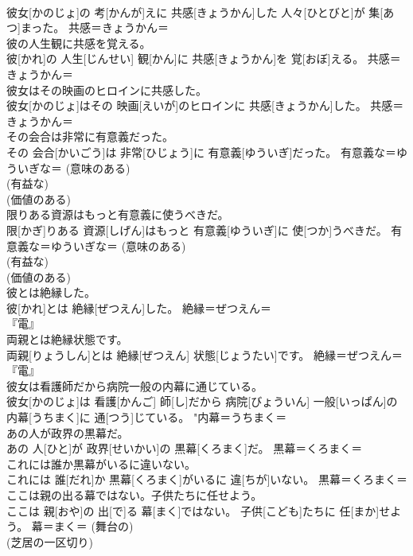 \documentclass[8pt]{extreport}
\begin{document}
\begin{CJK}{UTF8}{min}
{\\	彼女[かのじょ]の 考[かんが]えに 共感[きょうかん]した 人々[ひとびと]が 集[あつ]まった。	共感＝きょうかん＝ 
\\	彼の人生観に共感を覚える。	
\\	彼[かれ]の 人生[じんせい] 観[かん]に 共感[きょうかん]を 覚[おぼ]える。	共感＝きょうかん＝ 
\\	彼女はその映画のヒロインに共感した。	
\\	彼女[かのじょ]はその 映画[えいが]のヒロインに 共感[きょうかん]した。	共感＝きょうかん＝ 
\\	その会合は非常に有意義だった。	
\\	その 会合[かいごう]は 非常[ひじょう]に 有意義[ゆういぎ]だった。	有意義な＝ゆういぎな＝ (意味のある) 
\\	(有益な) 
\\	(価値のある) 
\\	限りある資源はもっと有意義に使うべきだ。	
\\	限[かぎ]りある 資源[しげん]はもっと 有意義[ゆういぎ]に 使[つか]うべきだ。	有意義な＝ゆういぎな＝ (意味のある) 
\\	(有益な) 
\\	(価値のある) 
\\	彼とは絶縁した。	
\\	彼[かれ]とは 絶縁[ぜつえん]した。	絶縁＝ぜつえん＝ 
\\	『電』
\\	両親とは絶縁状態です。	
\\	両親[りょうしん]とは 絶縁[ぜつえん] 状態[じょうたい]です。	絶縁＝ぜつえん＝ 
\\	『電』
\\	彼女は看護師だから病院一般の内幕に通じている。	
\\	彼女[かのじょ]は 看護[かんご] 師[し]だから 病院[びょういん] 一般[いっぱん]の 内幕[うちまく]に 通[つう]じている。	"内幕＝うちまく＝ 
\\	あの人が政界の黒幕だ。	
\\	あの 人[ひと]が 政界[せいかい]の 黒幕[くろまく]だ。	黒幕＝くろまく＝ 
\\	これには誰か黒幕がいるに違いない。	
\\	これには 誰[だれ]か 黒幕[くろまく]がいるに 違[ちが]いない。	黒幕＝くろまく＝ 
\\	ここは親の出る幕ではない。子供たちに任せよう。	
\\	ここは 親[おや]の 出[で]る 幕[まく]ではない。 子供[こども]たちに 任[まか]せよう。	幕＝まく＝ (舞台の) 
\\	(芝居の一区切り) 
}
\end{CJK}
\end{document}

